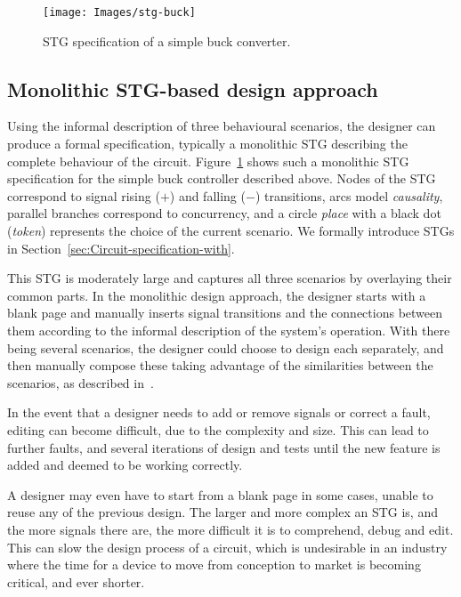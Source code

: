 \documentclass[british, journal]{IEEEtran}
\begin{document}
\begin{figure}[t]
\begin{centering}
\texttt{[image: Images/stg-buck]}
\par
\protect\caption{\label{fig:Monolithic-buck}STG specification of a simple buck converter.}
\par\end{centering}
\end{figure}

\subsection{Monolithic STG-based design approach\label{sub:Monolithic}}

Using the informal description of three behavioural scenarios, the designer can
produce a formal specification, typically a monolithic STG describing the
complete behaviour of the circuit. Figure~\ref{fig:Monolithic-buck} shows such
a monolithic STG specification for the simple buck controller described above.
Nodes of the STG correspond to signal rising ($+$) and falling ($-$) transitions,
arcs model \emph{causality}, parallel branches correspond to concurrency, and
a circle \emph{place} with a black dot (\emph{token}) represents the choice of
the current scenario. We formally introduce STGs
in Section~\ref{sec:Circuit-specification-with}.

This STG is moderately large and captures all three scenarios by overlaying
their common parts. In the monolithic design approach, the designer starts with
a blank page and manually inserts signal transitions and the connections between
them according to the informal description of the system's operation. With
there being several scenarios, the designer could choose to design each
separately, and then manually compose these taking advantage of the
similarities between the scenarios, as described
in~\cite{2014_sokolov_ftfc}\cite{sokolov2015design}.

In the event that a designer needs to add or remove signals or correct a fault,
editing can become difficult, due to the complexity and size. This can lead to
further faults, and several iterations of design and tests until the new
feature is added and deemed to be working correctly.

A designer may even have to start from a blank page in some cases, unable to
reuse any of the previous design. The larger and more complex an STG is, and
the more signals there are, the more difficult it is to comprehend,
debug and edit. This can slow the design process of a circuit, which is
undesirable in an industry where the time for a device to move from conception
to market is becoming critical, and ever shorter.
\end{document}
